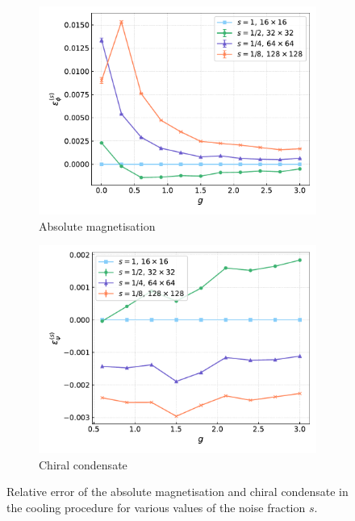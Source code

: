 \begin{figure}[htp]
    \centering
    \begin{subfigure}[b]{0.45\textwidth}
        \includegraphics[width=\textwidth]{figures/cooling/yukawa_scan/deviation.pdf}
        \caption{Absolute magnetisation}
    \end{subfigure}
    \begin{subfigure}[b]{0.45\textwidth}
        \includegraphics[width=\textwidth]{figures/cooling/yukawa_scan/deviation_cond.pdf}
        \caption{Chiral condensate}
    \end{subfigure}
    \caption[Relative error in the cooling procedure at tree level.]{Relative error of the absolute magnetisation and chiral condensate in the cooling procedure for various values of the noise fraction $s$.}
    \label{fig:cooling_deviation_yukawa}
\end{figure} \\
